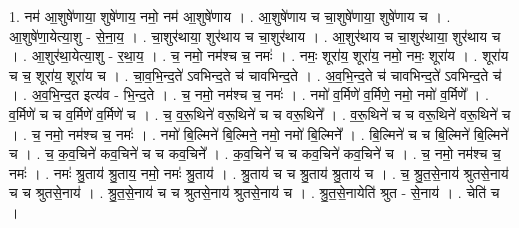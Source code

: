 \documentclass[17pt]{extarticle}
\begin{document}
1. नम॑ आ॒शुषे॑णाया॒ शुषे॑णाय॒ नमो॒ नम॑ आ॒शुषे॑णाय । . आ॒शुषे॑णाय च चा॒शुषे॑णाया॒ शुषे॑णाय च । . आ॒शुषे॑णा॒येत्या॒शु - से॒ना॒य॒ । . चा॒शुर॑थाया॒ शुर॑थाय च चा॒शुर॑थाय । . आ॒शुर॑थाय च चा॒शुर॑थाया॒ शुर॑थाय च । . आ॒शुर॑था॒येत्या॒शु - र॒था॒य॒ । . च॒ नमो॒ नम॑श्च च॒ नमः॑ । . नमः॒ शूरा॑य॒ शूरा॑य॒ नमो॒ नमः॒ शूरा॑य । . शूरा॑य च च॒ शूरा॑य॒ शूरा॑य च । . चा॒व॒भि॒न्द॒ते॑ ऽवभिन्द॒ते च॑ चावभिन्द॒ते । . अ॒व॒भि॒न्द॒ते च॑ चावभिन्द॒ते॑ ऽवभिन्द॒ते च॑ । . अ॒व॒भि॒न्द॒त इत्य॑व - भि॒न्द॒ते । . च॒ नमो॒ नम॑श्च च॒ नमः॑ । . नमो॑ व॒र्मिणे॑ व॒र्मिणे॒ नमो॒ नमो॑ व॒र्मिणे᳚ । . व॒र्मिणे॑ च च व॒र्मिणे॑ व॒र्मिणे॑ च । . च॒ व॒रू॒थिने॑ वरू॒थिने॑ च च वरू॒थिने᳚ । . व॒रू॒थिने॑ च च वरू॒थिने॑ वरू॒थिने॑ च । . च॒ नमो॒ नम॑श्च च॒ नमः॑ । . नमो॑ बि॒ल्मिने॑ बि॒ल्मिने॒ नमो॒ नमो॑ बि॒ल्मिने᳚ । . बि॒ल्मिने॑ च च बि॒ल्मिने॑ बि॒ल्मिने॑ च । . च॒ क॒व॒चिने॑ कव॒चिने॑ च च कव॒चिने᳚ । . क॒व॒चिने॑ च च कव॒चिने॑ कव॒चिने॑ च । . च॒ नमो॒ नम॑श्च च॒ नमः॑ । . नमः॑ श्रु॒ताय॑ श्रु॒ताय॒ नमो॒ नमः॑ श्रु॒ताय॑ । . श्रु॒ताय॑ च च श्रु॒ताय॑ श्रु॒ताय॑ च । . च॒ श्रु॒त॒से॒नाय॑ श्रुतसे॒नाय॑ च च श्रुतसे॒नाय॑ । . श्रु॒त॒से॒नाय॑ च च श्रुतसे॒नाय॑ श्रुतसे॒नाय॑ च । . श्रु॒त॒से॒नायेति॑ श्रुत - से॒नाय॑ । . चेति॑ च । \newline
\end{document}
